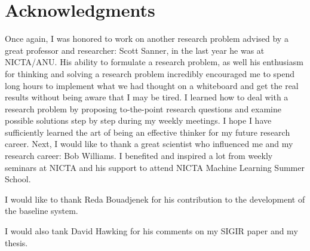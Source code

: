 \chapter*{Acknowledgments}

Once again, I was honored to work on another research problem advised by a great professor and researcher: Scott Sanner, in the last year he was at NICTA/ANU. His ability to formulate a research problem, as well his enthusiasm for thinking and solving a research problem incredibly encouraged me to spend long hours to implement what we had thought on a whiteboard and get the real results without being aware that I may be tired. I learned how to deal with a research problem by proposing to-the-point research questions and examine possible solutions step by step during my weekly meetings. I hope I have sufficiently learned the art of being an effective thinker for my future research career. Next, I would like to thank a great scientist who influenced me and my research career: Bob Williams. I benefited and inspired a lot from weekly seminars at NICTA and his support to attend NICTA Machine Learning Summer School.  

I would like to thank Reda Bouadjenek for his contribution to the development of the baseline system. 

I would also tank David Hawking for his comments on my SIGIR paper and my thesis.